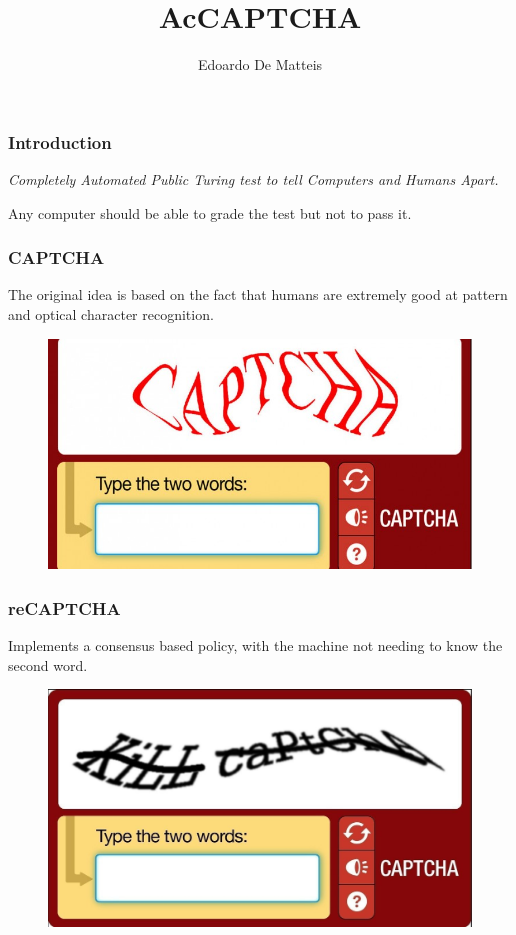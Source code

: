 \documentclass{beamer}
\title{AcCAPTCHA}
\author{Edoardo De Matteis}
\institute{Sapienza University of Rome}
\date{}
\begin{document}
\frame{\titlepage}


\begin{frame}
	\frametitle{Introduction}
	\emph{Completely Automated Public Turing test to tell Computers and Humans Apart.}

	\pause

	Any computer should be able to grade the test but not to pass it.

\end{frame}

\begin{frame}
	\frametitle{CAPTCHA}
	The original idea is based on the fact that humans are extremely good at pattern and optical character recognition.
	\begin{figure}[h!t]
		\centering
		\includegraphics[scale=0.25]{assets/images/captcha.jpg}
	\end{figure}

\end{frame}

\begin{frame}
	\frametitle{reCAPTCHA}
	Implements a consensus based policy, with the machine not needing to know the second word.
	\begin{figure}[h!t]
		\centering
		\includegraphics[scale=0.3]{assets/images/recaptcha.jpg}
	\end{figure}

\end{frame}
\end{document}
